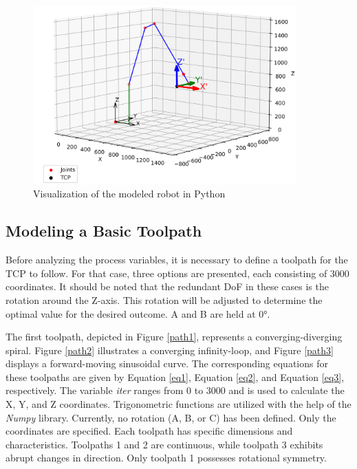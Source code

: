  \begin{figure}[H]
	\centerline{\includegraphics[width=0.9\textwidth]{figures/robotprog.png}}
	\caption{Visualization of the modeled robot in Python}
	\label{robotprog}
\end{figure}


\subsection{Modeling a Basic Toolpath}\label{MBT}
Before analyzing the process variables, it is necessary to define a toolpath for the \acrshort{TCP} to follow. For that case, three options are presented, each consisting of 3000 coordinates. It should be noted that the redundant \acrshort{DoF} in these cases is the rotation around the Z-axis. This rotation will be adjusted to determine the optimal value for the desired outcome. A and B are held at 0°.

The first toolpath, depicted in Figure \ref{path1}, represents a converging-diverging spiral. Figure \ref{path2} illustrates a converging infinity-loop, and Figure \ref{path3} displays a forward-moving sinusoidal curve. The corresponding equations for these toolpaths are given by Equation \ref{eq1}, Equation \ref{eq2}, and Equation \ref{eq3}, respectively. The variable \textit{iter} ranges from 0 to 3000 and is used to calculate the X, Y, and Z coordinates. Trigonometric functions are utilized with the help of the \textit{Numpy} library. Currently, no rotation (A, B, or C) has been defined. Only the coordinates are specified. Each toolpath has specific dimensions and characteristics. Toolpaths 1 and 2 are continuous, while toolpath 3 exhibits abrupt changes in direction. Only toolpath 1 possesses rotational symmetry.\newpage


